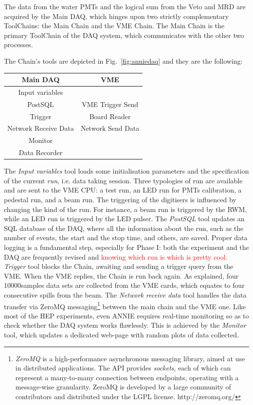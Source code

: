 The data from the water PMTs and the logical sum from the Veto and MRD are acquired by the Main DAQ, %
which hinges upon two strictly complementary ToolChains: the Main Chain and the VME Chain.
The Main Chain is the primary ToolChain of the DAQ system, which communicates with the other two %
processes.

The Chain's tools are depicted in Fig.~\ref{fig:anniedaq} and they are the following:

\begin{center}
  \small
  \begin{tabular}{cc}
    \toprule
    \textbf{Main DAQ}	& \textbf{VME}		\\
    \midrule
    Input variables 		&   \\
    PostSQL 			& VME Trigger Send   \\
    Trigger			& Board Reader	\\
    Network Receive Data	& Network Send Data	\\
    Monitor			& 	\\
    Data Recorder		& 	\\
    \bottomrule
  \end{tabular}
\end{center}

The \emph{Input variables} tool loads some initialisation parameters and the specification of %
the current \emph{run}, i.e. data taking session.
Three typologies of run are available and are sent to the VME CPU: a test run, an LED run for PMTs %
calibration, a pedestal run, and a beam run.
The triggering of the digitisers is influenced by changing the kind of the run.
For instance, a beam run is triggered by the RWM, while an LED run is triggered by the LED pulser.
The \emph{PostSQL} tool updates an SQL database of the DAQ, where all the information about %
the run, such as the number of events, the start and the stop time, and others, are saved.
Proper data logging is a fundamental step, especially for Phase I: both the experiment and the DAQ %
are frequently revised and \textcolor{red}{knowing which run is which is pretty cool.}
\emph{Trigger} tool blocks the Chain, awaiting and sending a trigger query from the VME.
When the VME replies, the Chain is run back again.
As explained, four 10000samples data sets are collected from the VME cards, which equates to %
four consecutive spills from the beam.
The \emph{Network receive data} tool handles the data transfer via ZeroMQ %
messaging\footnote{\emph{ZeroMQ} %
  is a high-performance asynchronous messaging library, aimed at use in distributed applications.
  The API provides \emph{sockets}, each of which can represent a many-to-many connection %
  between endpoints, operating with a message-wise granularity.
  ZeroMQ is developed by a large community of contributors and distributed under the LGPL license.
  http://zeromq.org/} %
between the main chain and the VME one.
Like most of the HEP experiments, even ANNIE requires real-time monitoring so as to check whether %
the DAQ system works flawlessly.
This is achieved by the \emph{Monitor} tool, which updates a dedicated web-page with %
random plots of data collected.

